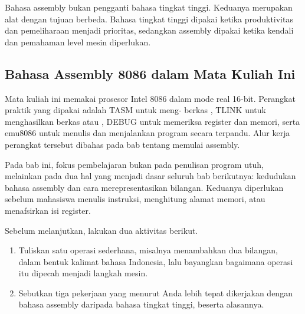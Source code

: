 \begin{infobox}
\vspace{1.1em}
Bahasa assembly bukan pengganti bahasa tingkat tinggi. Keduanya
merupakan alat dengan tujuan berbeda. Bahasa tingkat tinggi dipakai
ketika produktivitas dan pemeliharaan menjadi prioritas, sedangkan
assembly dipakai ketika kendali dan pemahaman level mesin diperlukan.
\end{infobox}

\subsection{Bahasa Assembly 8086 dalam Mata Kuliah Ini}

Mata kuliah ini memakai prosesor Intel 8086 dalam mode real 16-bit.
Perangkat praktik yang dipakai adalah TASM untuk meng-%
 berkas , TLINK untuk menghasilkan berkas
 atau , DEBUG untuk memeriksa register dan
memori, serta emu8086 untuk menulis dan menjalankan program secara
terpandu. Alur kerja perangkat tersebut dibahas pada bab tentang
memulai assembly.

Pada bab ini, fokus pembelajaran bukan pada penulisan program utuh,
melainkan pada dua hal yang menjadi dasar seluruh bab berikutnya:
kedudukan bahasa assembly dan cara merepresentasikan bilangan.
Keduanya diperlukan sebelum mahasiswa menulis instruksi, menghitung
alamat memori, atau menafsirkan isi register.

\begin{aktivitasbox}
\vspace{1.1em}
Sebelum melanjutkan, lakukan dua aktivitas berikut.
\begin{enumerate}
    \item Tuliskan satu operasi sederhana, misalnya menambahkan dua
          bilangan, dalam bentuk kalimat bahasa Indonesia, lalu
          bayangkan bagaimana operasi itu dipecah menjadi langkah
          mesin.
    \item Sebutkan tiga pekerjaan yang menurut Anda lebih tepat
          dikerjakan dengan bahasa assembly daripada bahasa tingkat
          tinggi, beserta alasannya.
\end{enumerate}
\end{aktivitasbox}
